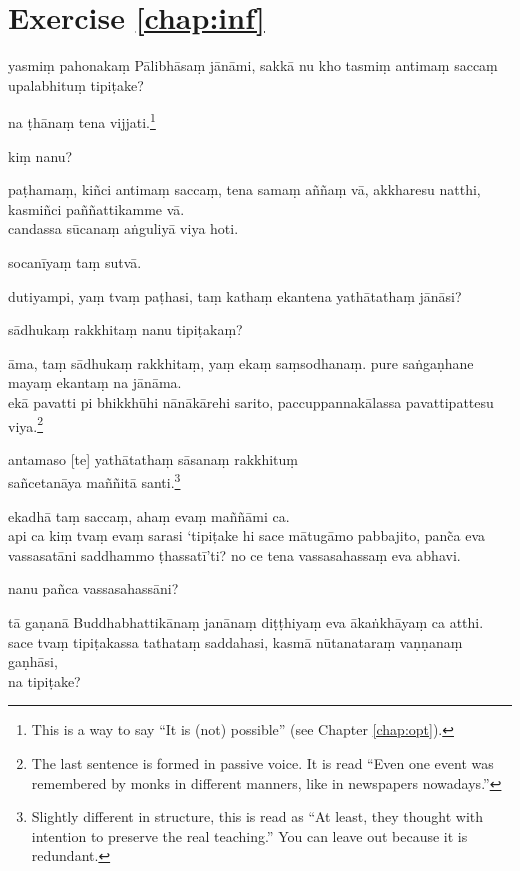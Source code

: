 \section*{Exercise \ref{chap:inf}}
\begin{answerkey}
\item yasmi\d m pahonaka\d m P\=alibh\=asa\d m j\=an\=ami, sakk\=a nu kho tasmi\d m antima\d m sacca\d m upalabhitu\d m tipi\d take?
\item na \d th\=ana\d m tena vijjati.\footnote{This is a way to say ``It is (not) possible'' (see Chapter \ref{chap:opt}).}
\item ki\d m nanu?
\item pa\d thama\d m, ki\~nci antima\d m sacca\d m, tena sama\d m a\~n\~na\d m v\=a, akkharesu natthi, kasmi\~nci pa\~n\~nattikamme v\=a. \\candassa s\=ucana\d m a\.nguliy\=a viya hoti.
\item socan\=iya\d m ta\d m sutv\=a.
\item dutiyampi, ya\d m tva\d m pa\d thasi, ta\d m katha\d m ekantena yath\=atatha\d m j\=an\=asi?
\item s\=adhuka\d m rakkhita\d m nanu tipi\d taka\d m?
\item \=ama, ta\d m s\=adhuka\d m rakkhita\d m, ya\d m eka\d m sa\d msodhana\d m. pure sa\.nga\d nhane maya\d m ekanta\d m na j\=an\=ama. \\ek\=a pavatti pi bhikkh\=uhi n\=an\=ak\=arehi sarito, paccuppannak\=alassa pavattipattesu viya.\footnote{The last sentence is formed in passive voice. It is read ``Even one event was remembered by monks in different manners, like in newspapers nowadays.''}
\item antamaso [te] yath\=atatha\d m s\=asana\d m rakkhitu\d m \\sa\~ncetan\=aya ma\~n\~nit\=a santi.\footnote{Slightly different in structure, this is read as ``At least, they thought with intention to preserve the real teaching.'' You can leave out  because it is redundant.}
\item ekadh\=a ta\d m sacca\d m, aha\d m eva\d m ma\~n\~n\=ami ca. \\api ca ki\d m tva\d m eva\d m sarasi `tipi\d take hi sace m\=atug\=amo pabbajito, pan\~ca eva vassasat\=ani saddhammo \d thassat\=i'ti? no ce tena vassasahassa\d m eva abhavi.
\item nanu pa\~nca vassasahass\=ani?
\item t\=a ga\d nan\=a Buddhabhattik\=ana\d m jan\=ana\d m di\d t\d thiya\d m eva \=aka\.nkh\=aya\d m ca atthi. sace tva\d m tipi\d takassa tathata\d m saddahasi, kasm\=a n\=utanatara\d m va\d n\d nana\d m ga\d nh\=asi, \\na tipi\d take?

\end{answerkey}
